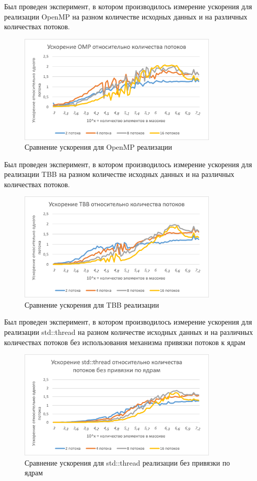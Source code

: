 \documentclass{report}
\begin{document}
\par Был проведен эксперимент, в котором производилось измерение ускорения для реализации OpenMP на разном количестве исходных данных и на различных количествах потоков.
\begin{figure}[H]
    \centering
    \includegraphics[width=0.85\textwidth]{images/boost_omp.png}
    \caption{Сравнение ускорения для OpenMP реализации}
    \label{fig:my_label_3}
\end{figure}
\par Был проведен эксперимент, в котором производилось измерение ускорения для реализации TBB на разном количестве исходных данных и на различных количествах потоков.
\begin{figure}[H]
    \centering
    \includegraphics[width=0.85\textwidth]{images/boost_tbb.png}
    \caption{Сравнение ускорения для TBB реализации}
    \label{fig:my_label_4}
\end{figure}
\par Был проведен эксперимент, в котором производилось измерение ускорения для реализации std::thread на разном количестве исходных данных и на различных количествах потоков без использования механизма привязки потоков к ядрам
\begin{figure}[H]
    \centering
    \includegraphics[width=0.85\textwidth]{images/boost_std_without_affinity.png}
    \caption{Сравнение ускорения для std::thread реализации без привязки по ядрам}
    \label{fig:my_label_5}
\end{figure}
\end{document}
